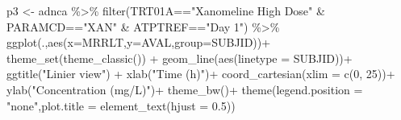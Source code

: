 \documentclass[
  letterpaper,
  DIV=11,
  numbers=noendperiod]{scrreprt}
\newenvironment{Shaded}{\begin{snugshade}}{\end{snugshade}}
\newcommand{\AttributeTok}[1]{\textcolor[rgb]{0.40,0.45,0.13}{#1}}
\newcommand{\DecValTok}[1]{\textcolor[rgb]{0.68,0.00,0.00}{#1}}
\newcommand{\FloatTok}[1]{\textcolor[rgb]{0.68,0.00,0.00}{#1}}
\newcommand{\FunctionTok}[1]{\textcolor[rgb]{0.28,0.35,0.67}{#1}}
\newcommand{\NormalTok}[1]{\textcolor[rgb]{0.00,0.23,0.31}{#1}}
\newcommand{\OtherTok}[1]{\textcolor[rgb]{0.00,0.23,0.31}{#1}}
\newcommand{\SpecialCharTok}[1]{\textcolor[rgb]{0.37,0.37,0.37}{#1}}
\newcommand{\StringTok}[1]{\textcolor[rgb]{0.13,0.47,0.30}{#1}}
\begin{document}
\begin{Shaded}
\begin{Highlighting}[]
\NormalTok{p3 }\OtherTok{\textless{}{-}}\NormalTok{ adnca }\SpecialCharTok{\%\textgreater{}\%} 
  \FunctionTok{filter}\NormalTok{(TRT01A}\SpecialCharTok{==}\StringTok{"Xanomeline High Dose"} \SpecialCharTok{\&} 
\NormalTok{        PARAMCD}\SpecialCharTok{==}\StringTok{"XAN"} \SpecialCharTok{\&}\NormalTok{ ATPTREF}\SpecialCharTok{==}\StringTok{"Day 1"}\NormalTok{) }\SpecialCharTok{\%\textgreater{}\%}
  \FunctionTok{ggplot}\NormalTok{(.,}\FunctionTok{aes}\NormalTok{(}\AttributeTok{x=}\NormalTok{MRRLT,}\AttributeTok{y=}\NormalTok{AVAL,}\AttributeTok{group=}\NormalTok{SUBJID))}\SpecialCharTok{+}
  \FunctionTok{theme\_set}\NormalTok{(}\FunctionTok{theme\_classic}\NormalTok{()) }\SpecialCharTok{+}
  \FunctionTok{geom\_line}\NormalTok{(}\FunctionTok{aes}\NormalTok{(}\AttributeTok{linetype =}\NormalTok{ SUBJID))}\SpecialCharTok{+}
  \FunctionTok{ggtitle}\NormalTok{(}\StringTok{"Linier view"}\NormalTok{) }\SpecialCharTok{+}
  \FunctionTok{xlab}\NormalTok{(}\StringTok{"Time (h)"}\NormalTok{)}\SpecialCharTok{+}
  \FunctionTok{coord\_cartesian}\NormalTok{(}\AttributeTok{xlim =} \FunctionTok{c}\NormalTok{(}\DecValTok{0}\NormalTok{, }\DecValTok{25}\NormalTok{))}\SpecialCharTok{+}
  \FunctionTok{ylab}\NormalTok{(}\StringTok{"Concentration (mg/L)"}\NormalTok{)}\SpecialCharTok{+}
  \FunctionTok{theme\_bw}\NormalTok{()}\SpecialCharTok{+} 
  \FunctionTok{theme}\NormalTok{(}\AttributeTok{legend.position =} \StringTok{"none"}\NormalTok{,}\AttributeTok{plot.title =} \FunctionTok{element\_text}\NormalTok{(}\AttributeTok{hjust =} \FloatTok{0.5}\NormalTok{)) }


\end{Highlighting}
\end{Shaded}
\end{document}
